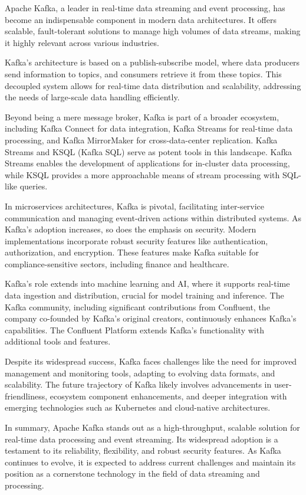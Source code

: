 \documentclass[12pt]{report}
\begin{document}
	Apache Kafka, a leader in real-time data streaming and event processing, has become an indispensable component in modern data architectures. It offers scalable, fault-tolerant solutions to manage high volumes of data streams, making it highly relevant across various industries.
	
	Kafka's architecture is based on a publish-subscribe model, where data producers send information to topics, and consumers retrieve it from these topics. This decoupled system allows for real-time data distribution and scalability, addressing the needs of large-scale data handling efficiently.
	
	Beyond being a mere message broker, Kafka is part of a broader ecosystem, including Kafka Connect for data integration, Kafka Streams for real-time data processing, and Kafka MirrorMaker for cross-data-center replication. Kafka Streams and KSQL (Kafka SQL) serve as potent tools in this landscape. Kafka Streams enables the development of applications for in-cluster data processing, while KSQL provides a more approachable means of stream processing with SQL-like queries.
	
	In microservices architectures, Kafka is pivotal, facilitating inter-service communication and managing event-driven actions within distributed systems. As Kafka's adoption increases, so does the emphasis on security. Modern implementations incorporate robust security features like authentication, authorization, and encryption. These features make Kafka suitable for compliance-sensitive sectors, including finance and healthcare.
	
	Kafka's role extends into machine learning and AI, where it supports real-time data ingestion and distribution, crucial for model training and inference. The Kafka community, including significant contributions from Confluent, the company co-founded by Kafka's original creators, continuously enhances Kafka's capabilities. The Confluent Platform extends Kafka's functionality with additional tools and features.
	
	Despite its widespread success, Kafka faces challenges like the need for improved management and monitoring tools, adapting to evolving data formats, and scalability. The future trajectory of Kafka likely involves advancements in user-friendliness, ecosystem component enhancements, and deeper integration with emerging technologies such as Kubernetes and cloud-native architectures.
	
	In summary, Apache Kafka stands out as a high-throughput, scalable solution for real-time data processing and event streaming. Its widespread adoption is a testament to its reliability, flexibility, and robust security features. As Kafka continues to evolve, it is expected to address current challenges and maintain its position as a cornerstone technology in the field of data streaming and processing.
	
\end{document}
